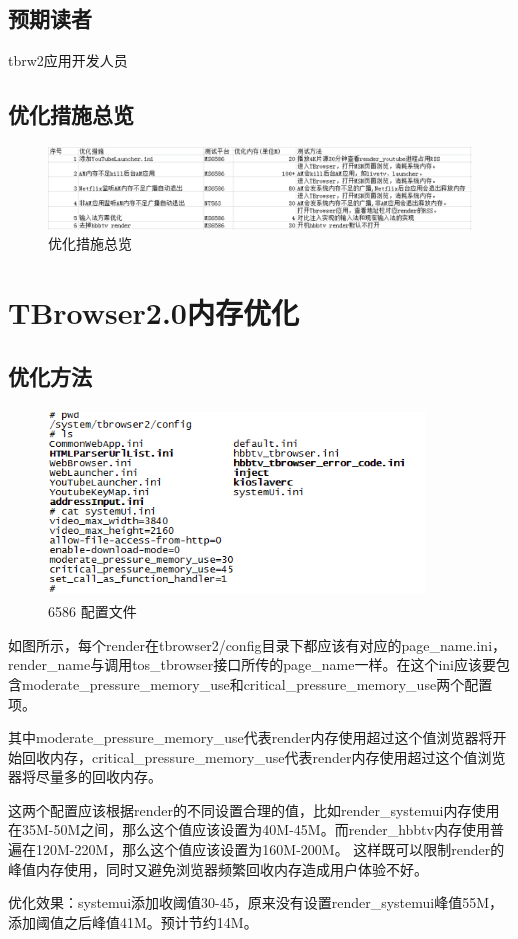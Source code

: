\subsection{预期读者}
tbrw2应用开发人员

\subsection{优化措施总览}
\begin{figure}[H]
  \centering
  \includegraphics[width=\textwidth]{image/tbrw2_app_optimization/total.png} 
  \caption{优化措施总览}
\end{figure}

\newpage
\section{TBrowser2.0内存优化}
\subsection{优化方法}
\begin{figure}[H]
  \centering
  \includegraphics[width=10cm,height=5cm]{image/tbrw2_app_optimization/ini.png} 
  \caption{6586 配置文件}
\end{figure}
如图所示，每个render在tbrowser2/config目录下都应该有对应的page\_name.ini，render\_name与调用tos\_tbrowser接口所传的page\_name一样。在这个ini应该要包含moderate\_pressure\_memory\_use和critical\_pressure\_memory\_use两个配置项。\par
其中moderate\_pressure\_memory\_use代表render内存使用超过这个值浏览器将开始回收内存，critical\_pressure\_memory\_use代表render内存使用超过这个值浏览器将尽量多的回收内存。\par
这两个配置应该根据render的不同设置合理的值，比如render\_systemui内存使用在35M-50M之间，那么这个值应该设置为40M-45M。而render\_hbbtv内存使用普遍在120M-220M，那么这个值应该设置为160M-200M。
这样既可以限制render的峰值内存使用，同时又避免浏览器频繁回收内存造成用户体验不好。\par
优化效果：systemui添加收阈值30-45，原来没有设置render\_systemui峰值55M，添加阈值之后峰值41M。预计节约14M。
